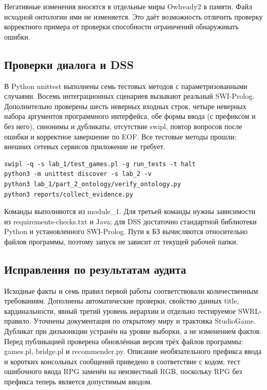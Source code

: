Негативные изменения вносятся в отдельные миры Owlready2 в памяти.
Файл исходной онтологии ими не изменяется. Это даёт возможность отличить
проверку корректного примера от проверки способности ограничений обнаруживать ошибки.

\subsection{Проверки диалога и DSS}
В Python unittest выполнены семь тестовых методов с параметризованными
случаями. Восемь интеграционных сценариев вызывают реальный SWI-Prolog.
Дополнительно проверены шесть неверных входных строк, четыре неверных набора
аргументов программного интерфейса, обе формы ввода (с префиксом и без него),
синонимы и дубликаты, отсутствие swipl,
повтор вопросов после ошибки и корректное завершение по EOF.
Все тестовые методы прошли; внешних сетевых сервисов приложение не требует.

\begin{lstlisting}
swipl -q -s lab_1/test_games.pl -g run_tests -t halt
python3 -m unittest discover -s lab_2 -v
python3 lab_1/part_2_ontology/verify_ontology.py
python3 reports/collect_evidence.py
\end{lstlisting}
Команды выполняются из module\_1. Для третьей команды нужны зависимости
из requirements-checks.txt и Java; для DSS достаточно стандартной библиотеки
Python и установленного SWI-Prolog. Пути к БЗ вычисляются относительно файлов
программы, поэтому запуск не зависит от текущей рабочей папки.

\subsection{Исправления по результатам аудита}
Исходные факты и семь правил первой работы соответствовали количественным требованиям.
Дополнены автоматические проверки, свойство данных title, кардинальности,
явный третий уровень иерархии и отдельно тестируемое SWRL-правило.
Уточнены документация по открытому миру и трактовка StudioGame.
Дубликат при дизъюнкции устранён на уровне выборки, а не изменением фактов.
Перед публикацией проверена обновлённая версия трёх файлов программы:
games.pl, bridge.pl и recommender.py. Описание необязательного префикса
ввода и коротких консольных сообщений приведено в соответствие с кодом;
тест ошибочного ввода RPG заменён на неизвестный RGB, поскольку RPG
без префикса теперь является допустимым вводом.
